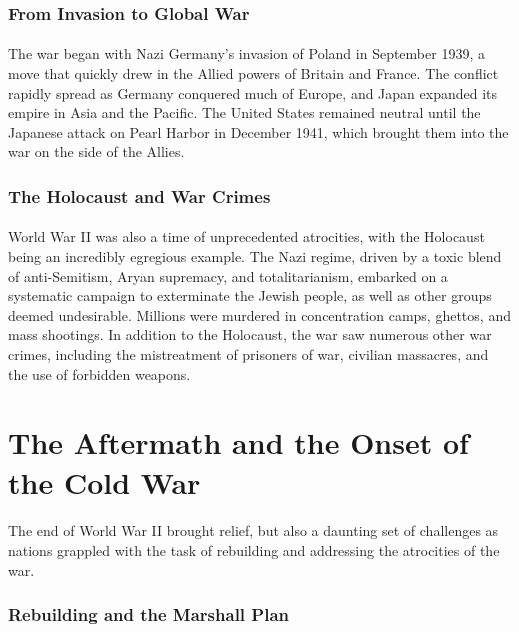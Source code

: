 \documentclass[a4paper,12pt]{book}
\begin{document}
\subsubsection*{From Invasion to Global War}
\paragraph{}
The war began with Nazi Germany’s invasion of Poland in September 1939, a move that quickly drew in the Allied powers of Britain and France. The conflict rapidly spread as Germany conquered much of Europe, and Japan expanded its empire in Asia and the Pacific. The United States remained neutral until the Japanese attack on Pearl Harbor in December 1941, which brought them into the war on the side of the Allies. 

\subsubsection*{The Holocaust and War Crimes}
\paragraph{}
World War II was also a time of unprecedented atrocities, with the Holocaust being an incredibly egregious example. The Nazi regime, driven by a toxic blend of anti-Semitism, Aryan supremacy, and totalitarianism, embarked on a systematic campaign to exterminate the Jewish people, as well as other groups deemed undesirable. Millions were murdered in concentration camps, ghettos, and mass shootings. In addition to the Holocaust, the war saw numerous other war crimes, including the mistreatment of prisoners of war, civilian massacres, and the use of forbidden weapons. 

\section*{The Aftermath and the Onset of the Cold War}
\paragraph{}
The end of World War II brought relief, but also a daunting set of challenges as nations grappled with the task of rebuilding and addressing the atrocities of the war.

\subsubsection*{Rebuilding and the Marshall Plan}
\end{document}
